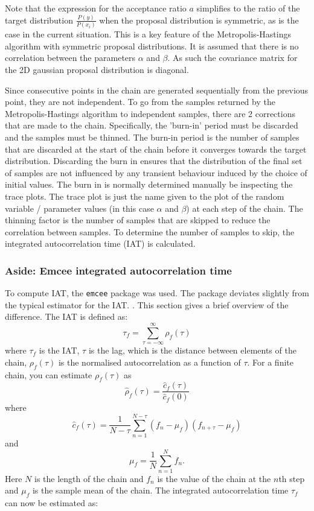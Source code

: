 \documentclass[11pt]{article}
\begin{document}
Note that the expression for the acceptance ratio $a$ simplifies to the ratio of the target distribution $\frac{P(y)}{P(x_i)}$ when the proposal distribution is symmetric, as is the case in the current situation. This is a key feature of the Metropolis-Hastings algorithm with symmetric proposal distributions. It is assumed that there is no correlation between the parameters $\alpha$ and $\beta$. As such the covariance matrix for the 2D gaussian proposal distribution is diagonal. 

Since consecutive points in the chain are generated sequentially from the previous point, they are not independent. To go from the samples returned by the Metropolis-Hastings algorithm to independent samples, there are 2 corrections that are made to the chain. Specifically, the 'burn-in' period must be discarded and the samples must be thinned. 
The burn-in period is the number of samples that are discarded at the start of the chain before it converges towards the target distribution. Discarding the burn in ensures that the distribution of the final set of samples are not influenced by any transient behaviour induced by the choice of initial values. The burn in is normally determined manually be inspecting the trace plots. The trace plot is just the name given to the plot of the random variable / parameter values (in this case $\alpha$ and $\beta$) at each step of the chain.
The thinning factor is the number of samples that are skipped to reduce the correlation between samples. To determine the number of samples to skip, the integrated autocorrelation time (IAT) is calculated. 
\subsubsection{Aside: Emcee integrated autocorrelation time}
To compute IAT, the \texttt{emcee} package was used. The package deviates slightly from the typical estimator for the IAT. \cite{emcee}. This section gives a brief overview of the difference.  The IAT is defined as:
\begin{equation}
\tau_f = \sum_{\tau=-\infty}^{\infty} \rho_f(\tau)
\end{equation}
where  \(\tau_f\) is the IAT, \(\tau\) is the lag, which is the distance between elements of the chain, \(\rho_f(\tau)\) is the normalised autocorrelation as a function of \(\tau\). For a finite chain, you can estimate \(\rho_f(\tau)\) as
\begin{equation}
\hat{\rho}_f(\tau) = \frac{\hat{c}_f(\tau)}{\hat{c}_f(0)}
\end{equation}
where
\begin{equation}
\hat{c}_f(\tau) = \frac{1}{N - \tau} \sum_{n=1}^{N-\tau} (f_n - \mu_f) (f_{n+\tau} - \mu_f)
\end{equation}
and
\begin{equation}
\mu_f = \frac{1}{N} \sum_{n=1}^{N} f_n.
\end{equation}
Here \(N\) is the length of the chain and \(f_n\) is the value of the chain at the \(n\)th step and \(\mu_f\) is the sample mean of the chain. The integrated autocorrelation time \(\tau_f\) can now be estimated as:
\end{document}
